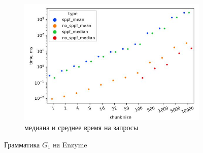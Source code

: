 \documentclass[14pt]{matmex-diploma-custom}
\theoremstyle{definition}
\begin{document}
\begin{figure}[H]
\begin{subfigure}[b]{0.5\textwidth}
    \includegraphics[width=\textwidth]{pics/st_sppf_mean&median.pdf_1.jpg}  \caption{медиана и среднее время на запросы}
    \label{fig:subim0}
    \end{subfigure} \caption{Грамматика $G_1$ на Enzyme}
    \label{enz1}
    \end{figure}
\end{document}
